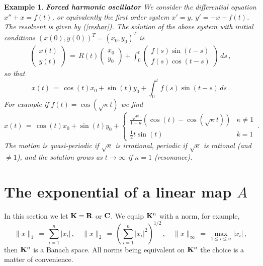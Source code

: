 \documentclass[12pt]{report}
\newcommand{\bC}{{\bf C}}
\newcommand{\bK}{{\bf K}}
\newcommand{\bR}{{\bf R}}
\newtheorem{example}[theorem]{Example}
\def\eqref#1{(\ref{#1})}
\def\to{\rightarrow}
\begin{document}
\begin{example}{\rm {\bf Forced harmonic oscillator} We consider 
the differential equation $x'' + x = f(t)$, or equivalently the first order 
system $x'=y $, $y'= -x - f(t)$. The resolvent is given by \eqref{reshar}.
The solution of the above system with initial conditions $(x(0),y(0))^T =
(x_0,y_0)^T$ is 
\begin{eqnarray}
\left( \begin{array}{c} x(t) \\ y(t) \end{array} \right) \,=\, 
 R(t)  \left( \begin{array}{c} x_0 \\ y_0 
\end{array} \right) +  
\int_0^t \left( \begin{array}{c} f(s)\sin(t-s) \\ f(s)\cos(t-s)\end{array} 
\right) \, ds \,,
\end{eqnarray}
so that 
\begin{equation}
x(t) \,=\, \cos(t)x_0 + \sin(t) y_0 + \int_{0}^t f(s) \sin(t-s)\, ds\,.
\end{equation}
For example if $f(t) = \cos(\sqrt\kappa t)$ we find 
\begin{equation}
x(t) \,=\, \cos(t)x_0 + \sin(t) y_0 + \left\{ \begin{array}{ll}
\frac{\sqrt{\kappa}}{1-\kappa}(\cos(t) -\cos(\sqrt\kappa t)) & \kappa
\not= 1 \\ \frac{1}{2}t \sin(t) & k=1 \end{array} \right. \,.
\end{equation}
The motion is quasi-periodic if $\sqrt\kappa$ is irrational, periodic
if $\sqrt\kappa$ is rational (and $\not=1$), and the solution grows as
$t \to \infty$ if $\kappa =1$ (resonance).


}
\end{example}


\section{The exponential of a linear map $A$} 

In this section we let $\bK= \bR$ or $\bC$. We equip $\bK^n$ with a norm, for example,
\begin{equation}\label{3n}
\|x\|_1 \,=\, \sum_{i=1}^n  |x_i|\,, 
\quad \|x\|_2 \,=\, \left( \sum_{i=1}^n  |x_i|^2 \right)^{1/2} \,, 
\quad \|x\|_\infty \,=\, \max_{1 \le i \le n}  |x_i| \,,
\end{equation}
then $\bK^n$ is a Banach space. All norms being equivalent on $\bK^n$ 
the choice is a matter of convenience. 
\end{document}
